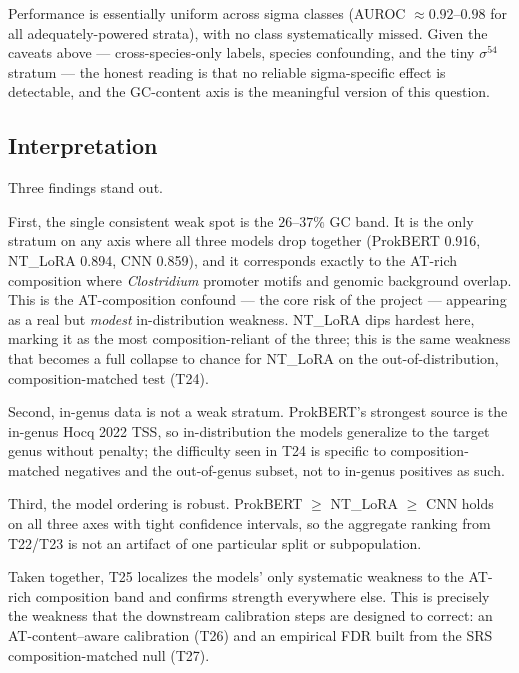 \documentclass{article}
\begin{document}
Performance is essentially uniform across sigma classes (AUROC $\approx 0.92$--$0.98$ for all adequately-powered strata), with no class systematically missed. Given the caveats above --- cross-species-only labels, species confounding, and the tiny $\sigma^{54}$ stratum --- the honest reading is that no reliable sigma-specific effect is detectable, and the GC-content axis is the meaningful version of this question.

\subsection{Interpretation}
Three findings stand out.

First, the single consistent weak spot is the $26$--$37\%$ GC band. It is the only stratum on any axis where all three models drop together (ProkBERT 0.916, NT\_LoRA 0.894, CNN 0.859), and it corresponds exactly to the AT-rich composition where \emph{Clostridium} promoter motifs and genomic background overlap. This is the AT-composition confound --- the core risk of the project --- appearing as a real but \emph{modest} in-distribution weakness. NT\_LoRA dips hardest here, marking it as the most composition-reliant of the three; this is the same weakness that becomes a full collapse to chance for NT\_LoRA on the out-of-distribution, composition-matched test (T24).

Second, in-genus data is not a weak stratum. ProkBERT's strongest source is the in-genus Hocq 2022 TSS, so in-distribution the models generalize to the target genus without penalty; the difficulty seen in T24 is specific to composition-matched negatives and the out-of-genus subset, not to in-genus positives as such.

Third, the model ordering is robust. ProkBERT $\ge$ NT\_LoRA $\ge$ CNN holds on all three axes with tight confidence intervals, so the aggregate ranking from T22/T23 is not an artifact of one particular split or subpopulation.

Taken together, T25 localizes the models' only systematic weakness to the AT-rich composition band and confirms strength everywhere else. This is precisely the weakness that the downstream calibration steps are designed to correct: an AT-content--aware calibration (T26) and an empirical FDR built from the SRS composition-matched null (T27).
\end{document}
